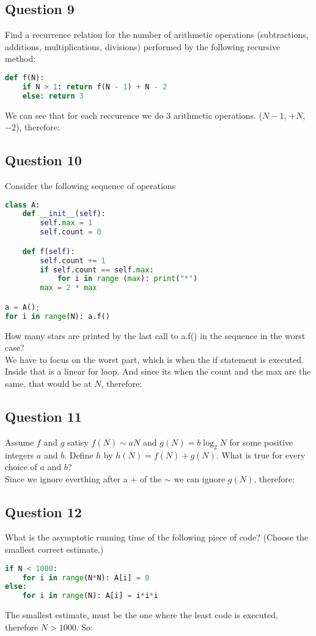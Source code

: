 \subsection{Question 9}
Find a recurrence relation for the number of arithmetic operations (subtractions, additions, multiplications, divisions) performed by the following recursive method:
\begin{lstlisting}[language=python]
def f(N):
    if N > 1: return f(N - 1) + N - 2
    else: return 3
\end{lstlisting}
We can see that for each reccurence we do 3 arithmetic operations. ($N-1$, $+N$, $-2$), therefore:\\[1ex]


\subsection{Question 10}
Consider the following sequence of operations
\begin{lstlisting}[language=python]
class A:
    def __init__(self):
        self.max = 1
        self.count = 0

    def f(self):
        self.count += 1
        if self.count == self.max:
            for i in range (max): print("*")
        max = 2 * max

a = A(); 
for i in range(N): a.f()
\end{lstlisting}
How many stars are printed by the last call to a.f() in the sequence in the worst case?\\
We have to focus on the worst part, which is when the if statement is executed.
Inside that is a linear for loop. And since its when the count and the max are the same, that would be at $N$, therefore:\\[1ex]


\subsection{Question 11}
Assume $f$ and $g$ satisy $f(N)\sim a N$ and $g(N)=b \log_2 N$ for some positive integers $a$ and $b$. Define $h$ by $h(N)=f(N)+g(N)$. What is true for every choice of $a$ and $b$?\\
Since we ignore everthing after a $+$ of the $\sim$ we can ignore $g(N)$, therefore:\\[1ex]


\subsection{Question 12}
What is the asymptotic running time of the following piece of code? (Choose the smallest correct estimate.)
\begin{lstlisting}[language=python]
if N < 1000:
    for i in range(N*N): A[i] = 0
else:
    for i in range(N): A[i] = i*i*i
\end{lstlisting}
The smallest estimate, must be the one where the least code is executed, therefore $N>1000$. So:\\[1ex]



